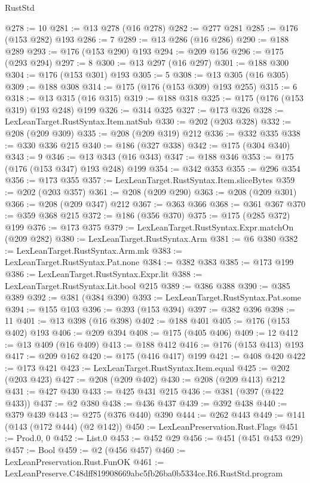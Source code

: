 \begin{lexlean}{RustStd}
\begin{coremodule}
@278 := 10
@281 := @13 @278 (@16 @278)
@282 := @277 @281
@285 := @176 (@153 @282) @193
@286 := 7
@289 := @13 @286 (@16 @286)
@290 := @188 @289
@293 := @176 (@153 @290) @193
@294 := @209 @156
@296 := @175 (@293 @294)
@297 := 8
@300 := @13 @297 (@16 @297)
@301 := @188 @300
@304 := @176 (@153 @301) @193
@305 := 5
@308 := @13 @305 (@16 @305)
@309 := @188 @308
@314 := @175 (@176 (@153 @309) @193 @255)
@315 := 6
@318 := @13 @315 (@16 @315)
@319 := @188 @318
@325 := @175 (@176 (@153 @319) @193 @248) @199
@326 := @314 @325
@327 := @173 @326
@328 := LexLeanTarget.RustSyntax.Item.natSub
@330 := @202 (@203 @328)
@332 := @208 (@209 @309)
@335 := @208 (@209 @319) @212
@336 := @332 @335
@338 := @330 @336 @215
@340 := @186 (@327 @338)
@342 := @175 (@304 @340)
@343 := 9
@346 := @13 @343 (@16 @343)
@347 := @188 @346
@353 := @175 (@176 (@153 @347) @193 @248) @199
@354 := @342 @353
@355 := @296 @354
@356 := @173 @355
@357 := LexLeanTarget.RustSyntax.Item.sliceBytes
@359 := @202 (@203 @357)
@361 := @208 (@209 @290)
@363 := @208 (@209 @301)
@366 := @208 (@209 @347) @212
@367 := @363 @366
@368 := @361 @367
@370 := @359 @368 @215
@372 := @186 (@356 @370)
@375 := @175 (@285 @372) @199
@376 := @173 @375
@379 := LexLeanTarget.RustSyntax.Expr.matchOn (@209 @282)
@380 := LexLeanTarget.RustSyntax.Arm
@381 := @6 @380
@382 := LexLeanTarget.RustSyntax.Arm.mk
@383 := LexLeanTarget.RustSyntax.Pat.none
@384 := @382 @383
@385 := @173 @199
@386 := LexLeanTarget.RustSyntax.Expr.lit
@388 := LexLeanTarget.RustSyntax.Lit.bool @215
@389 := @386 @388
@390 := @385 @389
@392 := @381 (@384 @390)
@393 := LexLeanTarget.RustSyntax.Pat.some
@394 := @155 @103
@396 := @393 (@153 @394)
@397 := @382 @396
@398 := 11
@401 := @13 @398 (@16 @398)
@402 := @188 @401
@405 := @176 (@153 @402) @193
@406 := @209 @394
@408 := @175 (@405 @406)
@409 := 12
@412 := @13 @409 (@16 @409)
@413 := @188 @412
@416 := @176 (@153 @413) @193
@417 := @209 @162
@420 := @175 (@416 @417) @199
@421 := @408 @420
@422 := @173 @421
@423 := LexLeanTarget.RustSyntax.Item.equal
@425 := @202 (@203 @423)
@427 := @208 (@209 @402)
@430 := @208 (@209 @413) @212
@431 := @427 @430
@433 := @425 @431 @215
@436 := @381 (@397 (@422 @433))
@437 := @2 @380
@438 := @436 @437
@439 := @392 @438
@440 := @379 @439
@443 := @275 (@376 @440) @390
@444 := @262 @443
@449 := @141 (@143 (@172 @444) (@2 @142))
@450 := LexLeanPreservation.Rust.Flags
@451 := Prod.{0, 0}
@452 := List.{0}
@453 := @452 @29
@456 := @451 (@451 @453 @29)
@457 := Bool
@459 := @2 (@456 @457)
@460 := LexLeanPreservation.Rust.FunOK
@461 := LexLeanPreserve.C48dff819908669abc5fb26ba0b5334ce.R6.RustStd.program

\end{coremodule}
\end{lexlean}
